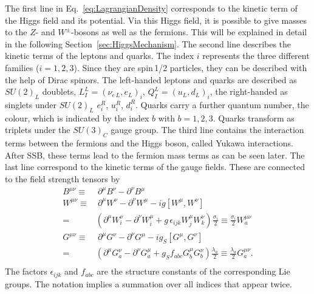 The first line in Eq.~\eqref{eq:LagrangianDensity} corresponds to the kinetic term of the Higgs field and its potential.
Via this Higgs field, it is possible to give masses to the $Z$- and $W^{\pm}$-bosons as well as the fermions.
This will be explained in detail in the following Section~\ref{sec:HiggsMechanism}.
The second line describes the kinetic terms of the leptons and quarks.
The index $i$ represents the three different families ($i=1,2,3$).
Since they are spin\,1/2 particles, they can be described with the help of Dirac spinors.
The left-handed leptons and quarks are described as $SU(2)_L$ doublets, $L_I^L = \left( \nu_{e\,L},e_L\right)_i$, $Q_I^L = \left( u_{L},d_L\right)_i$,  the right-handed as singlets under $SU(2)_L$ $e_i^R$, $u_i^R$, $d_i^R$.
Quarks carry a further quantum number, the colour, which is indicated by the index $b$ with $b=1,2,3$.
Quarks transform as triplets under the $SU(3)_C$ gauge group.
The third line contains the interaction terms between the fermions and the Higgs boson, called Yukawa interactions.
After SSB, these terms lead to the fermion mass terms as can be seen later.
The last line correspond to the kinetic terms of the gauge fields.
These are connected to the field strength tensors by
\begin{equation}
 \begin{split}
  B^{\mu\nu} \equiv &\ \partial^{\mu} B^{\nu} - \partial^{\nu} B^{\mu}\\  
  W^{\mu\nu} \equiv &\ \partial^{\mu} W^{\nu} - \partial^{\nu} W^{\mu} -i g \left[W^{\mu}, W^{\nu} \right]\\
             =& \left( \partial^{\mu} W_i^{\nu} -\partial^{\nu} W_i^{\mu} + g\, \epsilon_{ijk} W_j^{\mu} W_k^{\nu}  \right) \frac{\sigma_i}{2} \equiv \frac{\sigma_i}{2} W_a^{\mu\nu}\\
  G^{\mu\nu} \equiv &\ \partial^{\mu} G^{\nu} - \partial^{\nu} G^{\mu} - i g_S \left[G^{\mu}, G^{\nu} \right] \\
            =& \left( \partial^{\mu} G_a^{\nu} -\partial^{\nu} G_a^{\mu} + g_S f_{abc} G_b^{\mu} G_b^{\nu}  \right) \frac{\lambda_a}{2} \equiv \frac{\lambda_a}{2} G_a^{\mu\nu}.\\
 \end{split}
\end{equation}
The factors $\epsilon_{ijk}$ and $f_{abc}$ are the structure constants of the corresponding Lie groups.
The notation implies a summation over all indices that appear twice.


